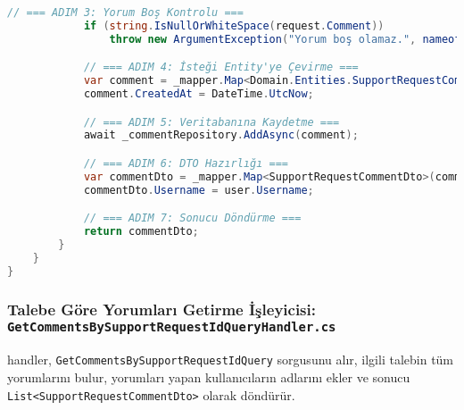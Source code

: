 \documentclass[11pt, a4paper]{article}
\begin{document}
\begin{lstlisting}[language=C#]
            // === ADIM 3: Yorum Boş Kontrolu ===
            if (string.IsNullOrWhiteSpace(request.Comment)) 
                throw new ArgumentException("Yorum boş olamaz.", nameof(request.Comment));

            // === ADIM 4: İsteği Entity'ye Çevirme ===
            var comment = _mapper.Map<Domain.Entities.SupportRequestComment>(request);
            comment.CreatedAt = DateTime.UtcNow; 

            // === ADIM 5: Veritabanına Kaydetme ===
            await _commentRepository.AddAsync(comment);

            // === ADIM 6: DTO Hazırlığı ===
            var commentDto = _mapper.Map<SupportRequestCommentDto>(comment);
            commentDto.Username = user.Username; 

            // === ADIM 7: Sonucu Döndürme ===
            return commentDto;
        }
    }
}
\end{lstlisting}

\subsubsection{Talebe Göre Yorumları Getirme İşleyicisi: \texttt{GetCommentsBySupportRequestIdQueryHandler.cs}}
\nBu handler, \texttt{GetCommentsBySupportRequestIdQuery} sorgusunu alır, ilgili talebin tüm yorumlarını bulur, yorumları yapan kullanıcıların adlarını ekler ve sonucu \texttt{List<SupportRequestCommentDto>} olarak döndürür.
\end{document}
